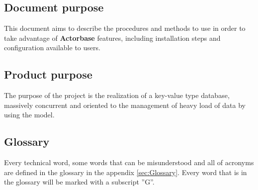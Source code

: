 \documentclass{scalatekids-article}
\begin{document}
\subsection{Document purpose}

This document aims to describe the procedures and methods to use in order to take
advantage of \textbf{Actorbase} features, including installation steps and configuration
available to users.

\subsection{Product purpose}

The purpose of the project is the realization of a key-value type
 database, massively concurrent and oriented to the management of heavy load of data by
using the  model.

\subsection{Glossary}
Every technical word, some words that can be misunderstood and all of acronyms are defined in the glossary in the appendix \ref{sec:Glossary}.
Every word that is in the glossary will be marked with a subscript ”G”.






\end{document}
